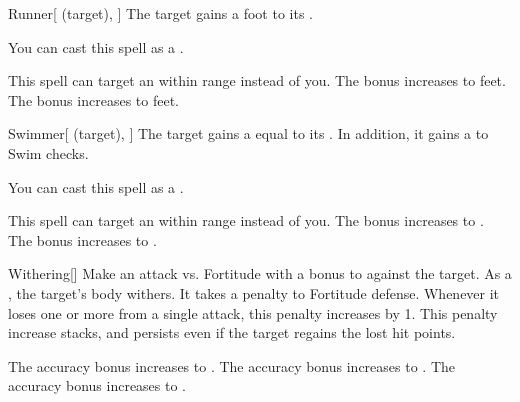 \lowercase{\hypertarget{spell:Runner}{}}\label{spell:Runner}
\begin{attuneability}[Rank 2]{\hypertarget{spell:Runner}{Runner}}[ (target), ]
The target gains a  foot  to its .

You can cast this spell as a .

\rankline
{} This spell can target an  within \rngmed range instead of you.
 The bonus increases to  feet.
 The bonus increases to  feet.

\end{attuneability}
\vspace{0.25em}



\lowercase{\hypertarget{spell:Swimmer}{}}\label{spell:Swimmer}
\begin{attuneability}[Rank 2]{\hypertarget{spell:Swimmer}{Swimmer}}[ (target), ]
The target gains a  equal to its .
In addition, it gains a   to Swim checks.

You can cast this spell as a .

\rankline
{} This spell can target an  within \rngmed range instead of you.
 The bonus increases to .
 The bonus increases to .

\end{attuneability}
\vspace{0.25em}



\lowercase{\hypertarget{spell:Withering}{}}\label{spell:Withering}
\begin{freeability}[Rank 2]{\hypertarget{spell:Withering}{Withering}}[]
Make an attack vs. Fortitude with a  bonus to  against the target.
\hit As a , the target's body withers.
It takes a  penalty to Fortitude defense.
Whenever it loses one or more  from a single attack, this penalty increases by 1.
This penalty increase stacks, and persists even if the target regains the lost hit points.

\rankline
{} The accuracy bonus increases to .
 The accuracy bonus increases to .
 The accuracy bonus increases to .

\end{freeability}
\vspace{0.25em}



